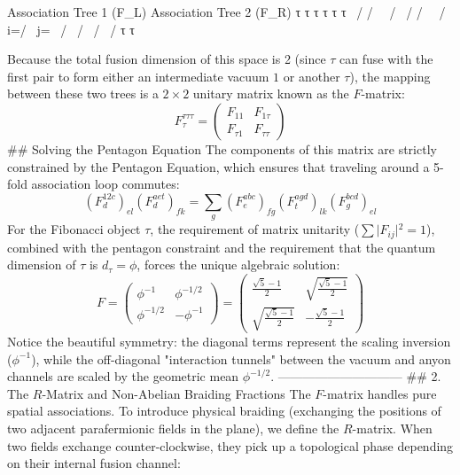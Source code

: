     Association Tree 1 (F_L)                Association Tree 2 (F_R)
        τ     τ     τ                           τ     τ     τ
         \   /     /                             \     \   /
          \ /     /                               \     \ /
          i=\tau /                                 \   j=\tau
            \   /                                   \   /
             \ /                                     \ /
              τ                                       τ

Because the total fusion dimension of this space is 2 (since $\tau$ can fuse with the first pair to form either an intermediate vacuum $1$ or another $\tau$), the mapping between these two trees is a $2 \times 2$ unitary matrix known as the $F$-matrix:
$$F^{\tau\tau\tau}_\tau = \begin{pmatrix} F_{11} & F_{1\tau} \\ F_{\tau 1} & F_{\tau\tau} \end{pmatrix}$$ 
## Solving the Pentagon Equation
The components of this matrix are strictly constrained by the Pentagon Equation, which ensures that traveling around a 5-fold association loop commutes:
$$(F^{12c}_d)_{el} (F^{aet}_d)_{fk} = \sum_{g} (F^{abc}_e)_{fg} (F^{agd}_t)_{lk} (F^{bcd}_g)_{el}$$ 
For the Fibonacci object $\tau$, the requirement of matrix unitarity ($\sum \vert{}F_{ij}\vert{}^2 = 1$), combined with the pentagon constraint and the requirement that the quantum dimension of $\tau$ is $d_\tau = \phi$, forces the unique algebraic solution:
$$F = \begin{pmatrix} \phi^{-1} & \phi^{-1/2} \\ \phi^{-1/2} & -\phi^{-1} \end{pmatrix} = \begin{pmatrix} \frac{\sqrt{5}-1}{2} & \sqrt{\frac{\sqrt{5}-1}{2}} \\ \sqrt{\frac{\sqrt{5}-1}{2}} & -\frac{\sqrt{5}-1}{2} \end{pmatrix}$$ 
Notice the beautiful symmetry: the diagonal terms represent the scaling inversion ($\phi^{-1}$), while the off-diagonal "interaction tunnels" between the vacuum and anyon channels are scaled by the geometric mean $\phi^{-1/2}$.
------------------------------
## 2. The $R$-Matrix and Non-Abelian Braiding Fractions
The $F$-matrix handles pure spatial associations. To introduce physical braiding (exchanging the positions of two adjacent parafermionic fields in the plane), we define the $R$-matrix.
When two fields exchange counter-clockwise, they pick up a topological phase depending on their internal fusion channel:
